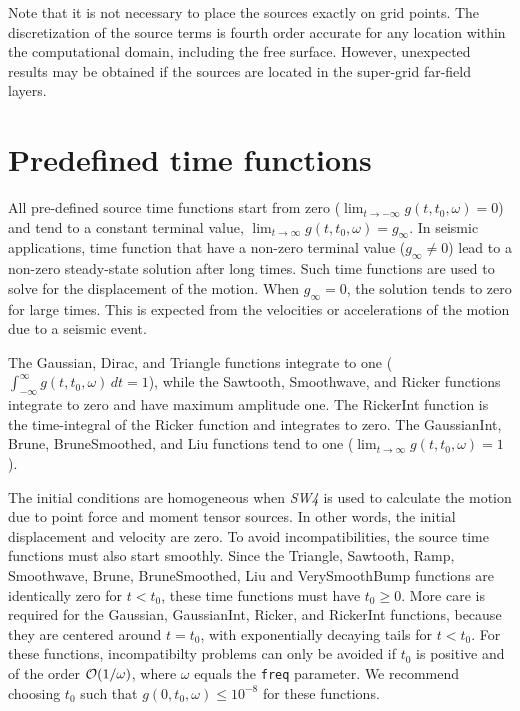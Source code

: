 \documentclass[11pt]{report}
\begin{document}
Note that it is not necessary to place the sources exactly on grid points. The discretization of the
source terms is fourth order accurate for any location within the computational domain, including
the free surface. However, unexpected results may be obtained if the sources are located in the
super-grid far-field layers.


\section{Predefined time functions}\label{sec:predefined}

All pre-defined source time functions start from zero ($\lim_{t\to -\infty} g(t,t_0,\omega) = 0$)
and tend to a constant terminal value, $\lim_{t\to \infty} g(t,t_0,\omega) = g_\infty$. In seismic
applications, time function that have a non-zero terminal value ($g_\infty\ne 0$) lead to a non-zero
steady-state solution after long times. Such time functions are used to solve for the displacement
of the motion. When $g_\infty = 0$, the solution tends to zero for large times. This is
expected from the velocities or accelerations of the motion due to a seismic event.

The Gaussian, Dirac, and Triangle functions integrate to one ($\int_{-\infty}^{\infty}
g(t,t_0,\omega) \, dt = 1$), while the Sawtooth, Smoothwave, and Ricker functions integrate to zero
and have maximum amplitude one. The RickerInt function is the time-integral of the Ricker function
and integrates to zero. The GaussianInt, Brune, BruneSmoothed, and Liu functions tend to one
($\lim_{t\to\infty} g(t,t_0,\omega) = 1$).

The initial conditions are homogeneous when \emph{SW4} is used to calculate the motion due to point
force and moment tensor sources. In other words, the initial displacement and velocity are zero. To
avoid incompatibilities, the source time functions must also start smoothly. Since the Triangle,
Sawtooth, Ramp, Smoothwave, Brune, BruneSmoothed, Liu and VerySmoothBump functions are identically
zero for $t<t_0$, these time functions must have $t_0\geq 0$. More care is required for the
Gaussian, GaussianInt, Ricker, and RickerInt functions, because they are centered around $t=t_0$,
with exponentially decaying tails for $t<t_0$. For these functions, incompatibilty problems can only
be avoided if $t_0$ is positive and of the order ${\cal O}(1/\omega)$, where $\omega$ equals the
{\tt freq} parameter. We recommend choosing $t_0$ such that $g(0,t_0,\omega) \leq 10^{-8}$ for these
functions.
\end{document}
